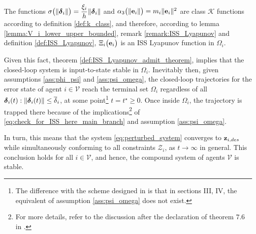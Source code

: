 The functions
$\sigma\big(\|\bm{\mathbf{\delta}}_i\|\big) = \dfrac{\xi_i}{h} \|\bm{\mathbf{\delta}}_i\|$
and $\alpha_3\big(\|\bm{\mathbf{e}}_i\|\big) = m_i \|\bm{\mathbf{e}}_i\|^2$ are class
$\mathcal{K}$ functions according to definition \eqref{def:k_class},
and therefore, according to lemma \eqref{lemma:V_i_lower_upper_bounded},
remark \eqref{remark:ISS_Lyapunov} and definition \eqref{def:ISS_Lyapunov},
$\Xi_i\big(\bm{\mathbf{e}}_i\big)$ is an ISS Lyapunov function in $\Omega_i$.

Given this fact, theorem \eqref{def:ISS_Lyapunov_admit_theorem}, implies that
the closed-loop system is input-to-state stable in $\Omega_i$. Inevitably then,
given assumptions \eqref{ass:phi_psi} and \eqref{ass:psi_omega}, the closed-loop
trajectories for the error state of agent $i \in \mathcal{V}$ reach
the terminal set $\Omega_i$ regardless of all
$\bm{\mathbf{\delta}}_i(t) : \|\bm{\mathbf{\delta}}_i(t)\| \leq \overline{\delta}_i$, at
some point\footnote{The difference with the scheme designed in
\cite{ISS_SKATOLINI} is that in sections III, IV, the equivalent of assumption
\eqref{ass:psi_omega} does not exist.} $t = t^{\star} \geq 0$. Once inside
$\Omega_i$, the trajectory is trapped there because of the
implications\footnote{For more details, refer to the discussion after the
declaration of theorem $7.6$ in \cite{marquez2003nonlinear}.} of
\eqref{eq:check_for_ISS_here_main_branch} and assumption \eqref{ass:psi_omega}.

In turn, this means that the system \eqref{eq:perturbed_system} converges
to $\bm{\mathbf{z}}_{i,des}$ while simultaneously conforming to
all constraints $\mathcal{Z}_i$, as $t \to \infty$ in general. This
conclusion holds for all $i \in \mathcal{V}$, and hence, the compound
system of agents $\mathcal{V}$ is stable.
\qedsymbol



